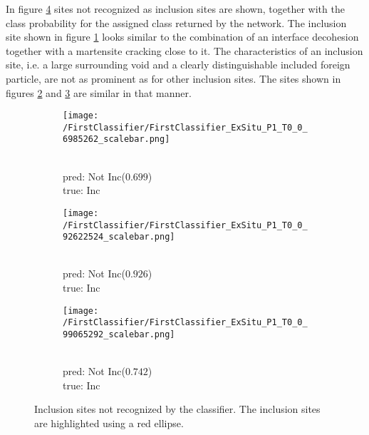 In figure \ref{fig:InceptionExSituPredictedRestTrueInc} sites not recognized as inclusion sites are shown, together with the class probability for the assigned class returned by the network. The inclusion site shown in figure \ref{sub:IncAsRest_1} looks similar to the combination of an interface decohesion together with a martensite cracking close to it. The characteristics of an inclusion site, i.e. a large surrounding void and a clearly distinguishable included foreign particle, are not as prominent as for other inclusion sites. The sites shown in figures \ref{sub:IncAsRest_2} and \ref{sub:IncAsRest_3} are similar in that manner. \\


\begin{figure}[H]
\centering
\begin{subfigure}{.3\textwidth}
\texttt{[image: /FirstClassifier/FirstClassifier\_ExSitu\_P1\_T0\_0\_6985262\_scalebar.png]}
\caption{\\pred: Not Inc($0.699$) \\true: Inc}
\label{sub:IncAsRest_1}
\end{subfigure}
\centering
\begin{subfigure}{.3\textwidth}
\texttt{[image: /FirstClassifier/FirstClassifier\_ExSitu\_P1\_T0\_0\_92622524\_scalebar.png]}
\caption{\\pred: Not Inc($0.926$) \\true: Inc}
\label{sub:IncAsRest_2}
\end{subfigure}
\centering
\begin{subfigure}{.3\textwidth}
\texttt{[image: /FirstClassifier/FirstClassifier\_ExSitu\_P1\_T0\_0\_99065292\_scalebar.png]}
\caption{\\pred: Not Inc($0.742$) \\true: Inc}
\label{sub:IncAsRest_3}
\end{subfigure}
\caption{Inclusion sites not recognized by the classifier. The inclusion sites are highlighted using a red ellipse.}
\label{fig:InceptionExSituPredictedRestTrueInc}

\end{figure}

